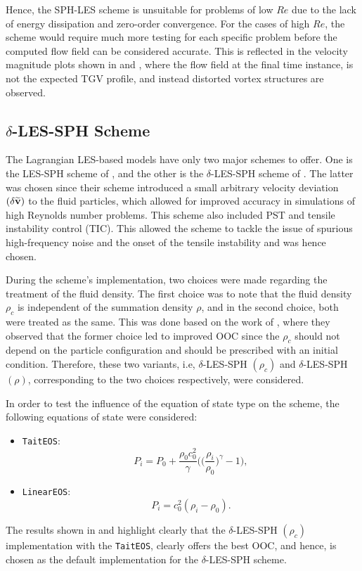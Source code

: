 Hence, the SPH-LES scheme is unsuitable for problems of low $Re$ due to the lack of energy dissipation and zero-order convergence. For the cases of high $Re$, the scheme would require much more testing for each specific problem before the computed flow field can be considered accurate. This is reflected in the velocity magnitude plots shown in  and , where the flow field at the final time instance, is not the expected TGV profile, and instead distorted vortex structures are observed.


\subsection[delta-LES-SPH Scheme]{$\delta$-LES-SPH Scheme}
The Lagrangian LES-based models have only two major schemes to offer. One is the LES-SPH scheme of \cite{DiMascio2017}, and the other is the $\delta$-LES-SPH scheme of \cite{Antuono_Marrone_Di_Mascio_Colagrossi_2021}.
The latter was chosen since their scheme introduced a small arbitrary velocity deviation $(\delta\widetilde{\mathbf{v}})$ to the fluid particles, which allowed for improved accuracy in simulations of high Reynolds number problems. This scheme also included PST and tensile instability control (TIC). This allowed the scheme to tackle the issue of spurious high-frequency noise and the onset of the tensile instability and was hence chosen.

During the scheme's implementation, two choices were made regarding the treatment of the fluid density. The first choice was to note that the fluid density $\rho_c$ is independent of the summation density $\rho$, and in the second choice, both were treated as the same. This was done based on the work of \cite{Negi2022Techniques}, where they observed that the former choice led to improved OOC since the $\rho_c$ should not depend on the particle configuration and should be prescribed with an initial condition. Therefore, these two variants, i.e, $\delta$-LES-SPH $(\rho_c)$ and $\delta$-LES-SPH $(\rho)$, corresponding to the two choices respectively, were considered.

In order to test the influence of the equation of state type on the scheme, the following equations of state were considered:
\begin{itemize}
  \item \texttt{TaitEOS}:
  \begin{equation}
    P_i = P_0 + \frac{\rho_0 c_0^2}{\gamma} \bigg( \Big( \frac{\rho_i}{\rho_0} \Big)^{\gamma} - 1 \bigg),
  \end{equation}

  \item \texttt{LinearEOS}:
  \begin{equation}
    P_i = c_0^2 (\rho_i - \rho_0).
  \end{equation}
\end{itemize}
The results shown in  and  highlight clearly that the $\delta$-LES-SPH $(\rho_c)$ implementation with the \texttt{TaitEOS}, clearly offers the best OOC, and hence, is chosen as the default implementation for the $\delta$-LES-SPH scheme.

